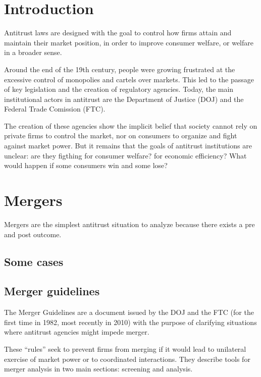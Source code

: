\section{Introduction}

Antitrust laws are designed with the goal to control how firms attain and maintain their market position, in order to improve consumer welfare, or welfare in a broader sense.

Around the end of the 19th century, people were growing frustrated at the excessive control of monopolies and cartels over markets. This led to the passage of key legislation and the creation of regulatory agencies. Today, the main institutional actors in antitrust are the Department of Justice (DOJ) and the Federal Trade Comission (FTC).

The creation of these agencies show the implicit belief that society cannot rely on private firms to control the market, nor on consumers to organize and fight against market power. But it remains that the goals of antitrust institutions are unclear: are they figthing for consumer welfare? for economic efficiency? What would happen if some consumers win and some lose?

\section{Mergers}

Mergers are the simplest antitrust situation to analyze because there exists a pre and post outcome.

\subsection{Some cases}



\subsection{Merger guidelines}

The Merger Guidelines are a document issued by the DOJ and the FTC (for the first time in 1982, most recently in 2010) with the purpose of clarifying situations where antitrust agencies might impede merger. 

These ``rules'' seek to prevent firms from merging if it would lead to unilateral exercise of market power or to coordinated interactions. They describe tools for merger analysis in two main sections: screening and analysis.

